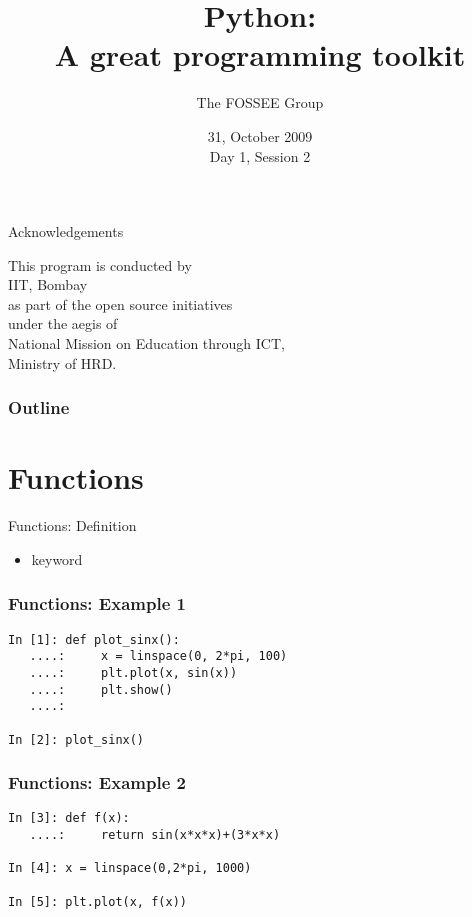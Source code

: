 \documentclass[14pt,compress]{beamer}
\title[Basic Python]{Python:\\A great programming toolkit}
\author[FOSEE Team] {The FOSSEE Group}
\institute[IIT Bombay] {Department of Aerospace Engineering\\IIT Bombay}
\date[] {31, October 2009\\Day 1, Session 2}
\newcounter{time}
\newcommand{\inctime}[1]{\addtocounter{time}{#1}{\tiny \thetime\ m}}
\newcommand{\kwrd}[1]{ \texttt{\textbf{\color{blue}{#1}}}  }
\begin{document}
\begin{frame}
  \titlepage
\end{frame}
\begin{frame}
  {Acknowledgements}
  \begin{center}
  This program is conducted by\\
  IIT, Bombay\\
  as part of  the open source initiatives\\
  under the aegis of\\
  \alert{National Mission on Education through ICT,} \\
  Ministry of HRD.
  \end{center}
\end{frame}

\begin{frame}
  \frametitle{Outline}
  \tableofcontents
\end{frame}

\section{Functions}
\begin{frame}{Functions: Definition}
\begin{itemize}
  \item \kwrd{def} keyword
\end{itemize}
\end{frame}

\begin{frame}[fragile]
\frametitle{Functions: Example 1}
  \begin{lstlisting}
In [1]: def plot_sinx():
   ....:     x = linspace(0, 2*pi, 100)
   ....:     plt.plot(x, sin(x))
   ....:     plt.show()
   ....:    

In [2]: plot_sinx()
  \end{lstlisting}
\end{frame}

\begin{frame}[fragile]
\frametitle{Functions: Example 2}
  \begin{lstlisting}
In [3]: def f(x):
   ....:     return sin(x*x*x)+(3*x*x)

In [4]: x = linspace(0,2*pi, 1000)

In [5]: plt.plot(x, f(x))
  \end{lstlisting}
  \inctime{10}
\end{frame}

\end{document}
